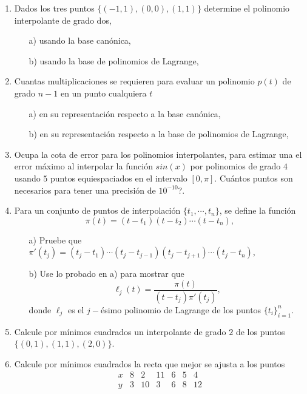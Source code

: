 \documentclass[11pt]{article}
\begin{document}
\begin{enumerate}

\item Dados los tres puntos $\{(-1,1),(0,0),(1,1)\}$ determine el polinomio interpolante de grado dos,
\begin{itemize}
 \item[a)] usando la base can\'onica,
 \item[b)] usando la base de polinomios de Lagrange,
\end{itemize}

\item Cuantas multiplicaciones se requieren para evaluar un polinomio $p(t)$ 
de grado $n-1$ en un punto cualquiera $t$ 
\begin{itemize}
 \item[a)] en su representaci\'on respecto a la base can\'onica,
 \item[b)] en su representaci\'on respecto a la base de polinomios de Lagrange,
\end{itemize}

\item Ocupa la cota de error para los polinomios interpolantes, para estimar una 
el error m\'aximo al interpolar la funci\'on $sin(x)$ por polinomios de grado $4$ usando 
$5$ puntos equiespaciados en el intervalo $[0,\pi]$. \textquestiondown Cu\'antos puntos son 
necesarios para tener una precisi\'on de $10^{-10}$?.

\item Para un conjunto de puntos de interpolaci\'on $\{t_1,\cdots,t_n\}$, se define la funci\'on
$$
\pi(t)=(t-t_1)(t-t_2)\cdots (t-t_n),
$$
\begin{itemize}
 \item[a)] Pruebe que $\pi'(t_j)=(t_j-t_1)\cdots (t_j-t_{j-1})(t_j-t_{j+1})\cdots (t_j-t_n)$,
 \item[b)] Use lo probado en a) para mostrar que
 $$
 \ell_j(t)=\frac{\pi(t)}{(t-t_j)\pi'(t_j)},
 $$
 donde $\ell_j$ es el $j-$\'esimo polinomio de Lagrange de los puntos $\{t_i\}_{i=1}^n$.
\end{itemize}

\item
Calcule por m\'inimos cuadrados un interpolante de grado $2$ de los puntos $\{(0,1),(1,1),(2,0)\}$.

\item
Calcule por m\'inimos cuadrados la recta que mejor se ajusta a los puntos
$$
\begin{array}{c||c|c|c|c|c|c|c|}
 x	& 8 & 2 & 11 & 6 & 5 & 4
 \\
 \hline
 y	& 3 & 10&  3 & 6 & 8 & 12
 \end{array}$$

\end{enumerate}
\end{document}
